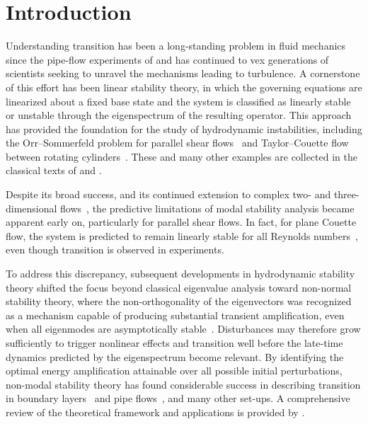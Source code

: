 \section{Introduction}
Understanding transition has been a long-standing problem in fluid mechanics since the pipe-flow experiments of \citet{reynolds-1883} and has continued to vex generations of scientists seeking to unravel the mechanisms leading to turbulence. A cornerstone of this effort has been linear stability theory, in which the governing equations are linearized about a fixed base state and the system is classified as linearly stable or unstable through the eigenspectrum of the resulting operator. This approach has provided the foundation for the study of hydrodynamic instabilities, including the Orr--Sommerfeld problem for parallel shear flows~\citep{orr-1907,sommerfeld-1908} and Taylor--Couette flow between rotating cylinders~\citep{taylor-1923}. These and many other examples are collected in the classical texts of \citet{chandrasekhar-1961} and \citet{drazin-reid-2004}.

Despite its broad success, and its continued extension to complex two- and three-dimensional flows~\citep{theofilis-2011}, the predictive limitations of modal stability analysis became apparent early on, particularly for parallel shear flows. In fact, for plane Couette flow, the system is predicted to remain linearly stable for all Reynolds numbers~\citep{romanov-1973}, even though transition is observed in experiments.


To address this discrepancy, subsequent developments in hydrodynamic stability theory shifted the focus beyond classical eigenvalue analysis toward non-normal stability theory, where the non-orthogonality of the eigenvectors was recognized as a mechanism capable of producing substantial transient amplification, even when all eigenmodes are asymptotically stable~\citep{trefethen-1993}. Disturbances may therefore grow sufficiently to trigger nonlinear effects and transition well before the late-time dynamics predicted by the eigenspectrum become relevant. By identifying the optimal energy amplification attainable over all possible initial perturbations, non-modal stability theory has found considerable success in describing transition in boundary layers~\citep{hoepffner-brandt-henningson-2005,monokrousos-et-al-2010} and pipe flows~\citep{meseguer-trefethen-2003}, and many other set-ups. A comprehensive review of the theoretical framework and applications is provided by \citet{schmid-2007}.


